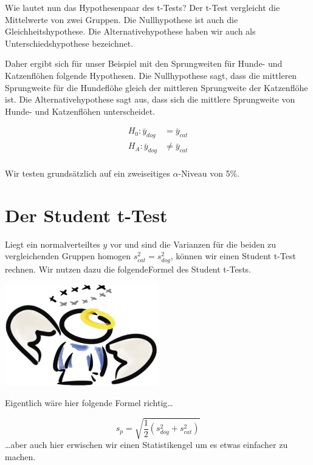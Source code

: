 \documentclass[
  letterpaper,
  DIV=11,
  oneside]{scrreport}
\begin{document}
Wie lautet nun das Hypothesenpaar des t-Tests? Der t-Test vergleicht die
Mittelwerte von zwei Gruppen. Die Nullhypothese ist auch die
Gleichheitshypothese. Die Alternativehypothese haben wir auch als
Unterschiedshypothese bezeichnet.

Daher ergibt sich für unser Beispiel mit den Sprungweiten für Hunde- und
Katzenflöhen folgende Hypothesen. Die Nullhypothese sagt, dass die
mittleren Sprungweite für die Hundeflöhe gleich der mittleren
Sprungweite der Katzenflöhe ist. Die Alternativehypothese sagt aus, dass
sich die mittlere Sprungweite von Hunde- und Katzenflöhen unterscheidet.

\begin{align*} 
H_0: \bar{y}_{dog} &= \bar{y}_{cat} \\  
H_A: \bar{y}_{dog} &\neq \bar{y}_{cat} \\   
\end{align*}

Wir testen grundsätzlich auf ein zweiseitiges \(\alpha\)-Niveau von 5\%.

\hypertarget{der-student-t-test}{%
\section{Der Student t-Test}\label{der-student-t-test}}

Liegt ein normalverteiltes \(y\) vor und sind die Varianzen für die
beiden zu vergleichenden Gruppen homogen \(s^2_{cat} = s^2_{dog}\),
können wir einen Student t-Test rechnen. Wir nutzen dazu die
folgendeFormel des Student t-Tests.

\begin{marginfigure}

{\centering \includegraphics[width=0.5\textwidth,height=\textheight]{./images/angel_01.png}

}

\end{marginfigure}

Eigentlich wäre hier folgende Formel richtig\ldots{}

\[
s_{p} = \sqrt{\frac{1}{2} (s^2_{dog} + s^2_{cat})}
\] \ldots aber auch hier erwischen wir einen Statistikengel um es etwas
einfacher zu machen.
\end{document}
